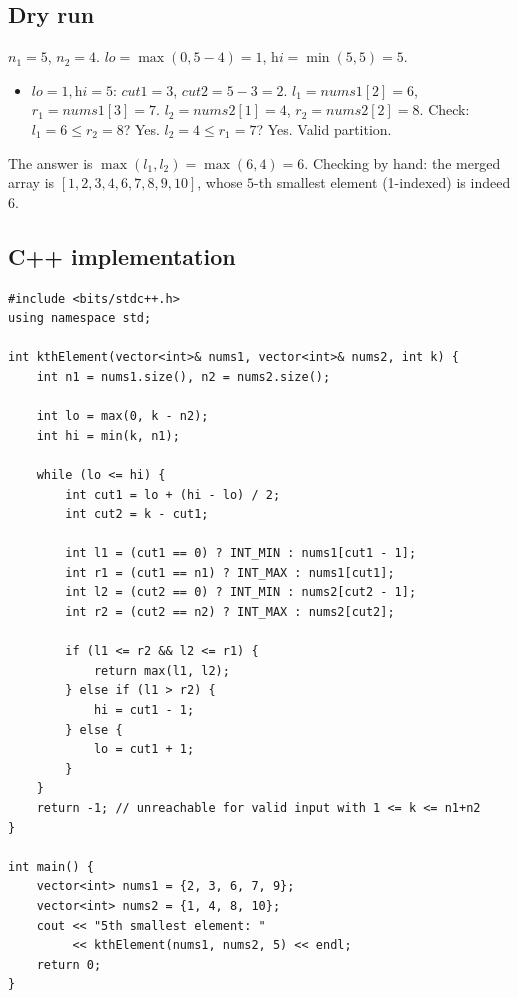 \subsection*{Dry run}


$n_1=5$, $n_2=4$. $\textit{lo}=\max(0,5-4)=1$,
$\textit{hi}=\min(5,5)=5$.

\begin{itemize}
  \item $\textit{lo}=1,\textit{hi}=5$: $\textit{cut1}=3$,
        $\textit{cut2}=5-3=2$. $l_1=\textit{nums1}[2]=6$,
        $r_1=\textit{nums1}[3]=7$. $l_2=\textit{nums2}[1]=4$,
        $r_2=\textit{nums2}[2]=8$. Check: $l_1=6 \le r_2=8$? Yes.
        $l_2=4 \le r_1=7$? Yes. Valid partition.
\end{itemize}

The answer is $\max(l_1,l_2) = \max(6,4) = 6$. Checking by hand: the
merged array is $[1,2,3,4,6,7,8,9,10]$, whose $5$-th smallest element
(1-indexed) is indeed $6$.

\subsection*{C++ implementation}

\begin{lstlisting}
#include <bits/stdc++.h>
using namespace std;

int kthElement(vector<int>& nums1, vector<int>& nums2, int k) {
    int n1 = nums1.size(), n2 = nums2.size();

    int lo = max(0, k - n2);
    int hi = min(k, n1);

    while (lo <= hi) {
        int cut1 = lo + (hi - lo) / 2;
        int cut2 = k - cut1;

        int l1 = (cut1 == 0) ? INT_MIN : nums1[cut1 - 1];
        int r1 = (cut1 == n1) ? INT_MAX : nums1[cut1];
        int l2 = (cut2 == 0) ? INT_MIN : nums2[cut2 - 1];
        int r2 = (cut2 == n2) ? INT_MAX : nums2[cut2];

        if (l1 <= r2 && l2 <= r1) {
            return max(l1, l2);
        } else if (l1 > r2) {
            hi = cut1 - 1;
        } else {
            lo = cut1 + 1;
        }
    }
    return -1; // unreachable for valid input with 1 <= k <= n1+n2
}

int main() {
    vector<int> nums1 = {2, 3, 6, 7, 9};
    vector<int> nums2 = {1, 4, 8, 10};
    cout << "5th smallest element: "
         << kthElement(nums1, nums2, 5) << endl;
    return 0;
}
\end{lstlisting}

